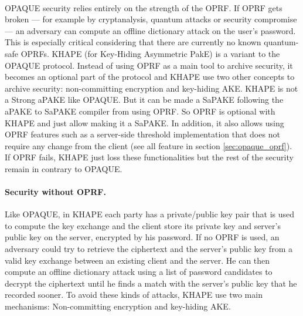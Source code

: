 ﻿\documentclass[../report.tex]{subfiles}
\begin{document}
\paragraph{}
OPAQUE security relies entirely on the strength of the OPRF. If OPRF gets broken --- for example by cryptanalysis, quantum attacks or security compromise --- an adversary can compute an offline dictionary attack on the user's password. This is especially critical considering that there are currently no known quantum-safe OPRFs.
KHAPE (for Key-Hiding Asymmetric PakE) \cite{KHAPE_Paper} is a variant to the OPAQUE protocol. Instead of using OPRF as a main tool to archive security, it becomes an optional part of the protocol and KHAPE use two other concepts to archive security: non-committing encryption and key-hiding AKE.
KHAPE is not a Strong aPAKE like OPAQUE. But it can be made a SaPAKE following the aPAKE to SaPAKE compiler from \cite{OPAQUE_Paper} using OPRF.
So OPRF is optional with KHAPE and just allow making it a SaPAKE. In addition, it also allows using OPRF features such as a server-side threshold implementation that does not require any change from the client (see all feature in section \ref{sec:opaque_oprf}). If OPRF fails, KHAPE just loss these functionalities but the rest of the security remain in contrary to OPAQUE.




\paragraph{Security without OPRF.}
Like OPAQUE, in KHAPE each party has a private/public key pair that is used to compute the key exchange and the client store its private key and server's public key on the server, encrypted by his password.
If no OPRF is used, an adversary could try to retrieve the ciphertext and the server's public key from a valid key exchange between an existing client and the server.
He can then compute an offline dictionary attack using a list of password candidates to decrypt the ciphertext until he finds a match with the server's public key that he recorded sooner.
To avoid these kinds of attacks, KHAPE use two main mechanisms: Non-committing encryption and key-hiding AKE.
\end{document}
